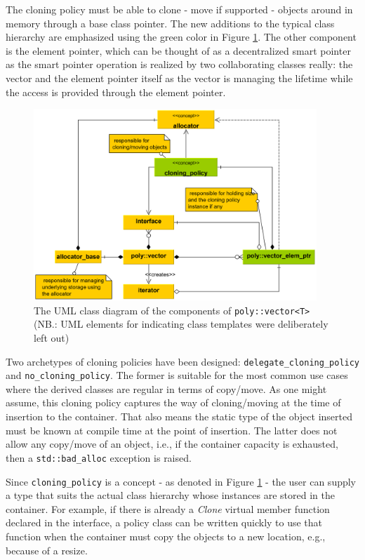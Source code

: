 \documentclass[a4paper,12pt]{article}
\begin{document}
The cloning policy must be able to clone - move if supported - objects around in memory through a base class pointer. The new additions to the typical class hierarchy are emphasized using the green color in Figure \ref{fig:polyvecdesign}. The other component is the element pointer, which can be thought of as a decentralized smart pointer as the smart pointer operation is realized by two collaborating classes really: the vector and the element pointer itself as the vector is managing the lifetime while the access is provided through the element pointer. 

\begin{figure}[!htb]
    \centering
    \includegraphics[width=0.95\textwidth]{polyvecdesign.png}
    \caption{The UML class diagram of the components of \lstinline{poly::vector<T>} (NB.: UML elements for indicating class templates were deliberately left out)}
    \label{fig:polyvecdesign}
\end{figure}

Two archetypes of cloning policies have been designed: \lstinline{delegate_cloning_policy} and \lstinline{no_cloning_policy}. The former is suitable for the most common use cases where the derived classes are regular in terms of copy/move. As one might assume, this cloning policy captures the way of cloning/moving at the time of insertion to the container. That also means the static type of the object inserted must be known at compile time at the point of insertion. The latter does not allow any copy/move of an object, i.e.,  if the container capacity is exhausted, then a \lstinline{std::bad_alloc} exception is raised.

Since \lstinline{cloning_policy} is a concept - as denoted in Figure \ref{fig:polyvecdesign} - the user can supply a type that suits the actual class hierarchy whose instances are stored in the container. For example, if there is already a \emph{Clone} virtual member function declared in the interface, a policy class can be written quickly to use that function when the container must copy the objects to a new location, e.g., because of a resize.
\end{document}

